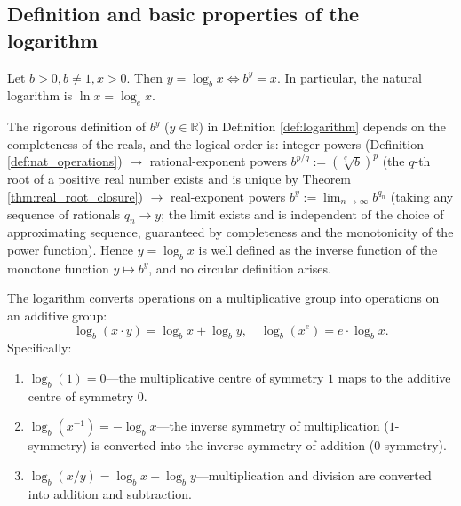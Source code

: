 \subsection{\texorpdfstring{Definition and basic properties of the logarithm}{Definition and basic properties of the logarithm}}

\begin{definition}\label{def:logarithm}
Let $b > 0, b \neq 1, x > 0$. Then $y = \log_b x \iff b^y = x$. In particular, the natural logarithm is $\ln x = \log_e x$.
\end{definition}

\begin{remark}
The rigorous definition of $b^y$ ($y \in \mathbb{R}$) in Definition \ref{def:logarithm} depends on the completeness of the reals, and the logical order is: integer powers (Definition \ref{def:nat_operations}) $\to$ rational-exponent powers $b^{p/q} := (\sqrt[q]{b})^p$ (the $q$-th root of a positive real number exists and is unique by Theorem \ref{thm:real_root_closure}) $\to$ real-exponent powers $b^y := \lim_{n\to\infty} b^{q_n}$ (taking any sequence of rationals $q_n \to y$; the limit exists and is independent of the choice of approximating sequence, guaranteed by completeness and the monotonicity of the power function). Hence $y = \log_b x$ is well defined as the inverse function of the monotone function $y \mapsto b^y$, and no circular definition arises.
\end{remark}

\begin{theorem}\label{thm:logarithm_conversion}
The logarithm converts operations on a multiplicative group into operations on an additive group:
\[
\log_b(x \cdot y) = \log_b x + \log_b y, \quad \log_b(x^e) = e \cdot \log_b x.
\]
Specifically:
\begin{enumerate}[label=(\roman*)]
    \item $\log_b(1) = 0$---the multiplicative centre of symmetry $1$ maps to the additive centre of symmetry $0$.
    \item $\log_b(x^{-1}) = -\log_b x$---the inverse symmetry of multiplication ($1$-symmetry) is converted into the inverse symmetry of addition ($0$-symmetry).
    \item $\log_b(x / y) = \log_b x - \log_b y$---multiplication and division are converted into addition and subtraction.
\end{enumerate}
\end{theorem}

